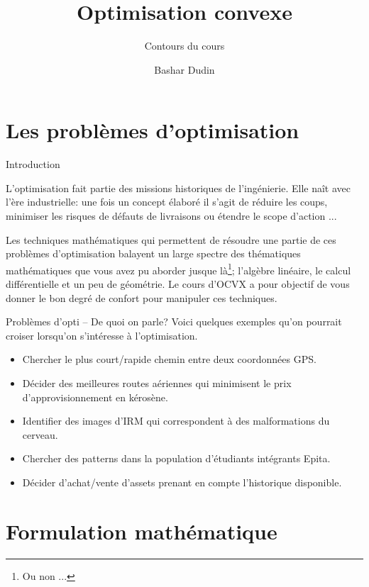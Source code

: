 \documentclass[aspectratio = 169]{beamer}
\author[BD]{Bashar Dudin}
\institute[]{EPITA}
\title{Optimisation convexe} %
\subtitle{Contours du cours}
\begin{document}
\begin{frame}[plain]
\titlepage %
\end{frame}

\section{Les problèmes d'optimisation}

\begin{frame}{Introduction}

  L'optimisation fait partie des missions historiques de
  l'ingénierie. Elle naît avec l'ère industrielle: une fois un
  concept élaboré il s'agit de réduire les coups, minimiser les
  risques de défauts de livraisons ou étendre le scope d'action ...

  \pause Les techniques mathématiques qui permettent de résoudre une
  partie de ces problèmes d'optimisation balayent un large spectre des
  thématiques mathématiques que vous avez pu aborder jusque
  là\footnote{Ou non ...}; l'algèbre linéaire, le calcul
  différentielle et un peu de géométrie. Le cours d'OCVX a pour
  objectif de vous donner le bon degré de confort pour manipuler ces
  techniques.
\end{frame}

\begin{frame}{Problèmes d'opti -- De quoi on parle?}
  Voici quelques exemples qu'on pourrait croiser lorsqu'on s'intéresse
  à l'optimisation.
  \begin{itemize}
  \item<1-> Chercher le plus court/rapide chemin entre deux coordonnées
    GPS.
  \item<2-> Décider des meilleures routes aériennes qui minimisent le
    prix d'approvisionnement en kérosène.
  \item<3-> Identifier des images d'IRM qui correspondent à des
    malformations du cerveau.
  \item<4-> Chercher des patterns dans la population d'étudiants
    intégrants Epita.
  \item<5-> Décider d'achat/vente d'assets prenant en compte
    l'historique disponible.
  \end{itemize}
\end{frame}

\section{Formulation mathématique}
\end{document}
